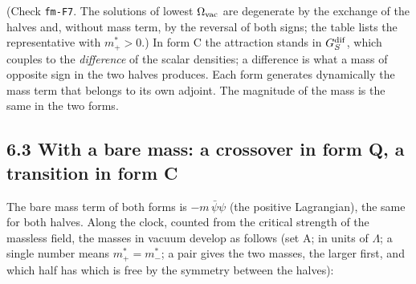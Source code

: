 \documentclass[
  10pt,
]{article}
\begin{document}
(Check \texttt{fm-F7}. The solutions of lowest \(\Omega_{\rm vac}\) are
degenerate by the exchange of the halves and, without mass term, by the
reversal of both signs; the table lists the representative with
\(m^*_+>0\).) In form C the attraction stands in \(G_S^{\rm dif}\),
which couples to the \emph{difference} of the scalar densities; a
difference is what a mass of opposite sign in the two halves produces.
Each form generates dynamically the mass term that belongs to its own
adjoint. The magnitude of the mass is the same in the two forms.

\hypertarget{with-a-bare-mass-a-crossover-in-form-q-a-transition-in-form-c}{%
\subsection{6.3 With a bare mass: a crossover in form Q, a transition in
form
C}\label{with-a-bare-mass-a-crossover-in-form-q-a-transition-in-form-c}}

The bare mass term of both forms is \(-m\,\bar\psi\psi\) (the positive
Lagrangian), the same for both halves. Along the clock, counted from the
critical strength of the massless field, the masses in vacuum develop as
follows (set A; in units of \(\Lambda\); a single number means
\(m^*_+=m^*_-\); a pair gives the two masses, the larger first, and
which half has which is free by the symmetry between the halves):
\end{document}
